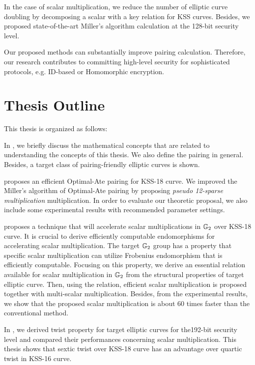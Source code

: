 In the case of scalar multiplication, we reduce the number of elliptic curve doubling by decomposing a scalar with a key relation for KSS curves.
Besides, we proposed state-of-the-art Miller's algorithm calculation at the 128-bit security level.

Our proposed methods can substantially improve pairing calculation.
Therefore, our research contributes to committing high-level security for sophisticated protocols, e.g. ID-based or Homomorphic encryption.

\section{Thesis Outline}
\label{ch1_sec_outline}
This thesis is organized as follows: 

In , we briefly discuss the mathematical concepts that are related to understanding the concepts of this thesis.
We also define the pairing in general. 
Besides, a target class of pairing-friendly elliptic curves is shown.

 proposes an efficient Optimal-Ate pairing for KSS-18 curve. 
We improved the Miller's algorithm of Optimal-Ate pairing by proposing \textit{pseudo 12-sparse multiplication} multiplication.
In order to evaluate our theoretic proposal, we also include some experimental results with recommended parameter settings.

 proposes a technique that will accelerate scalar multiplications in ${\mathbb{G}}_{2}$ over KSS-18 curve. 
It is crucial to derive efficiently computable endomorphisms for accelerating scalar multiplication.
The target ${\mathbb{G}}_{2}$ group has a property that specific scalar multiplication can utilize  Frobenius endomorphism that is efficiently computable.
Focusing on this property, we derive an essential relation available for scalar multiplication in ${\mathbb{G}}_{2}$ from the structural properties of target elliptic curve.
Then, using the relation, efficient scalar multiplication is proposed together with multi-scalar multiplication.
Besides, from the experimental results, we show that the proposed scalar multiplication is about 60 times faster than the conventional method.  

In , we derived twist property for target elliptic curves for the192-bit security level and compared their performances concerning scalar multiplication.
This thesis shows that sextic twist over KSS-18 curve has an advantage over quartic twist in KSS-16 curve.

